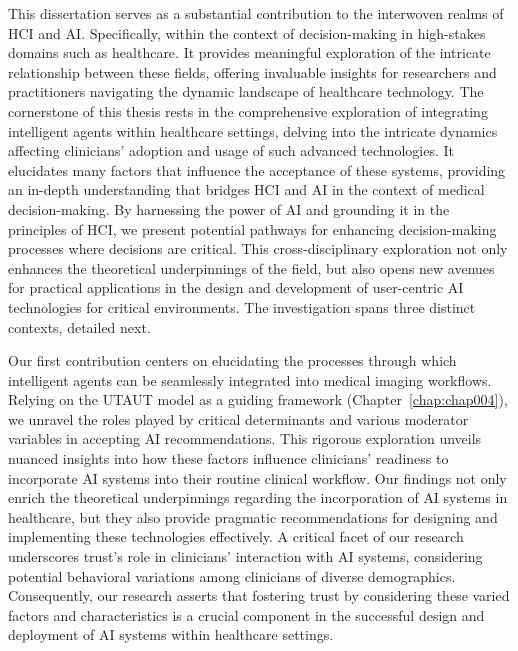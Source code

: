 This dissertation serves as a substantial contribution to the interwoven realms of \ac{HCI} and \ac{AI}.
Specifically, within the context of decision-making in high-stakes domains such as healthcare.
It provides meaningful exploration of the intricate relationship between these fields, offering invaluable insights for researchers and practitioners navigating the dynamic landscape of healthcare technology.
The cornerstone of this thesis rests in the comprehensive exploration of integrating intelligent agents within healthcare settings, delving into the intricate dynamics affecting clinicians' adoption and usage of such advanced technologies.
It elucidates many factors that influence the acceptance of these systems, providing an in-depth understanding that bridges \ac{HCI} and \ac{AI} in the context of medical decision-making.
By harnessing the power of \ac{AI} and grounding it in the principles of \ac{HCI}, we present potential pathways for enhancing decision-making processes where decisions are critical.
This cross-disciplinary exploration not only enhances the theoretical underpinnings of the field, but also opens new avenues for practical applications in the design and development of user-centric \ac{AI} technologies for critical environments.
The investigation spans three distinct contexts, detailed next.

Our first contribution centers on elucidating the processes through which intelligent agents can be seamlessly integrated into medical imaging workflows.
Relying on the \ac{UTAUT} model as a guiding framework (Chapter~\ref{chap:chap004}), we unravel the roles played by critical determinants and various moderator variables in accepting \ac{AI} recommendations.
This rigorous exploration unveils nuanced insights into how these factors influence clinicians' readiness to incorporate \ac{AI} systems into their routine clinical workflow.
Our findings not only enrich the theoretical underpinnings regarding the incorporation of \ac{AI} systems in healthcare, but they also provide pragmatic recommendations for designing and implementing these technologies effectively.
A critical facet of our research underscores trust's role in clinicians' interaction with \ac{AI} systems, considering potential behavioral variations among clinicians of diverse demographics.
Consequently, our research asserts that fostering trust by considering these varied factors and characteristics is a crucial component in the successful design and deployment of \ac{AI} systems within healthcare settings.

